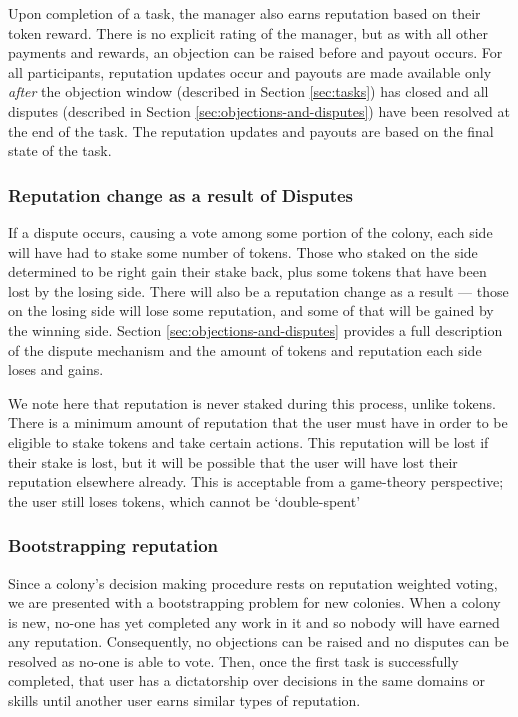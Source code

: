 Upon completion of a task, the manager also earns reputation based on their token reward. There is no explicit rating of the manager, but as with all other payments and rewards, an objection can be raised before and payout occurs. For all participants, reputation updates occur and payouts are made available only \emph{after} the objection window (described in Section \ref{sec:tasks}) has closed and all disputes  (described in Section \ref{sec:objections-and-disputes}) have been resolved at the end of the task. The reputation updates and payouts are based on the final state of the task.

\subsubsection{Reputation change as a result of Disputes}\label{sec:earning-rep-in-disputes}
If a dispute occurs, causing a vote among some portion of the colony, each side will have had to stake some number of tokens. Those who staked on the side determined to be right gain their stake back, plus some tokens that have been lost by the losing side. There will also be a reputation change as a result --- those on the losing side will lose some reputation, and some of that will be gained by the winning side. Section \ref{sec:objections-and-disputes} provides a full description of the dispute mechanism and the amount of tokens and reputation each side loses and gains.

We note here that reputation is never staked during this process, unlike tokens. There is a minimum amount of reputation that the user must have in order to be eligible to stake tokens and take certain actions. This reputation will be lost if their stake is lost, but it will be possible that the user will have lost their reputation elsewhere already. This is acceptable from a game-theory perspective; the user still loses tokens, which cannot be `double-spent'

\subsubsection{Bootstrapping reputation}\label{sec:bootstrapping-rep}
Since a colony's decision making procedure rests on reputation weighted voting, we are presented with a bootstrapping problem for new colonies. When a colony is new, no-one has yet completed any work in it and so nobody will have earned any reputation. Consequently, no objections can be raised and no disputes can be resolved as no-one is able to vote. Then, once the first task is successfully completed, that user has a dictatorship over decisions in the same domains or skills until another user earns similar types of reputation.


